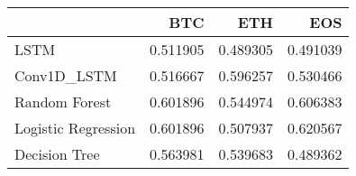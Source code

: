 \begin{tabular}{lrrr}
\toprule
{} &       BTC &       ETH &       EOS \\
\midrule
LSTM                &  0.511905 &  0.489305 &  0.491039 \\
Conv1D\_LSTM         &  0.516667 &  0.596257 &  0.530466 \\
Random Forest       &  0.601896 &  0.544974 &  0.606383 \\
Logistic Regression &  0.601896 &  0.507937 &  0.620567 \\
Decision Tree       &  0.563981 &  0.539683 &  0.489362 \\
\bottomrule
\end{tabular}
